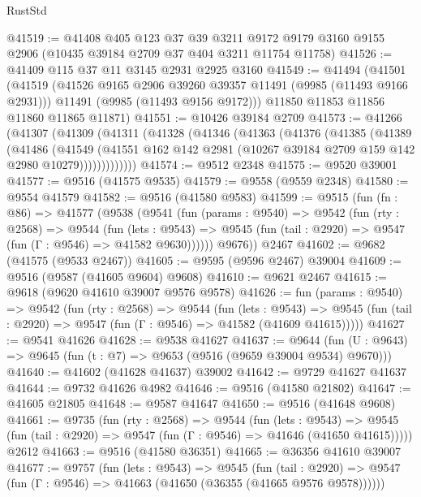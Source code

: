 \begin{lexlean}{RustStd}
\begin{coremodule}
@41519 := @41408
    @405
    @123
    @37
    @39
    @3211
    @9172
    @9179
    @3160
    @9155
    @2906
    (@10435 @39184 @2709 @37 @404 @3211 @11754 @11758)
@41526 := @41409 @115 @37 @11 @3145 @2931 @2925 @3160
@41549 := @41494
    (@41501
      (@41519
        (@41526 @9165 @2906 @39260 @39357 @11491 (@9985 (@11493 @9166 @2931)))
        @11491
        (@9985 (@11493 @9156 @9172)))
      @11850
      @11853
      @11856
      @11860
      @11865
      @11871)
@41551 := @10426 @39184 @2709
@41573 := @41266
    (@41307
      (@41309
        (@41311
          (@41328
            (@41346
              (@41363
                (@41376
                  (@41385
                    (@41389
                      (@41486
                        (@41549
                          (@41551
                            @162
                            @142
                            @2981
                            (@10267 @39184 @2709 @159 @142 @2980 @10279)))))))))))))
@41574 := @9512 @2348
@41575 := @9520 @39001
@41577 := @9516 (@41575 @9535)
@41579 := @9558 (@9559 @2348)
@41580 := @9554 @41579
@41582 := @9516 (@41580 @9583)
@41599 := @9515
    (fun (fn : @86) =>
    @41577
      (@9538
        (@9541
          (fun (params : @9540) =>
          @9542
            (fun (rty : @2568) =>
            @9544
              (fun (lets : @9543) =>
              @9545 (fun (tail : @2920) => @9547 (fun (Γ : @9546) => @41582 @9630))))))
        @9676))
    @2467
@41602 := @9682 (@41575 (@9533 @2467))
@41605 := @9595 (@9596 @2467) @39004
@41609 := @9516 (@9587 (@41605 @9604) @9608)
@41610 := @9621 @2467
@41615 := @9618 (@9620 @41610 @39007 @9576 @9578)
@41626 := fun (params : @9540) =>
  @9542
    (fun (rty : @2568) =>
    @9544
      (fun (lets : @9543) =>
      @9545 (fun (tail : @2920) => @9547 (fun (Γ : @9546) => @41582 (@41609 @41615)))))
@41627 := @9541 @41626
@41628 := @9538 @41627
@41637 := @9644
    (fun (U : @9643) => @9645 (fun (t : @7) => @9653 (@9516 (@9659 @39004 @9534) @9670)))
@41640 := @41602 (@41628 @41637) @39002
@41642 := @9729 @41627 @41637
@41644 := @9732 @41626 @4982
@41646 := @9516 (@41580 @21802)
@41647 := @41605 @21805
@41648 := @9587 @41647
@41650 := @9516 (@41648 @9608)
@41661 := @9735
    (fun (rty : @2568) =>
    @9544
      (fun (lets : @9543) =>
      @9545 (fun (tail : @2920) => @9547 (fun (Γ : @9546) => @41646 (@41650 @41615)))))
    @2612
@41663 := @9516 (@41580 @36351)
@41665 := @36356 @41610 @39007
@41677 := @9757
    (fun (lets : @9543) =>
    @9545
      (fun (tail : @2920) =>
      @9547 (fun (Γ : @9546) => @41663 (@41650 (@36355 (@41665 @9576 @9578))))))

\end{coremodule}
\end{lexlean}
